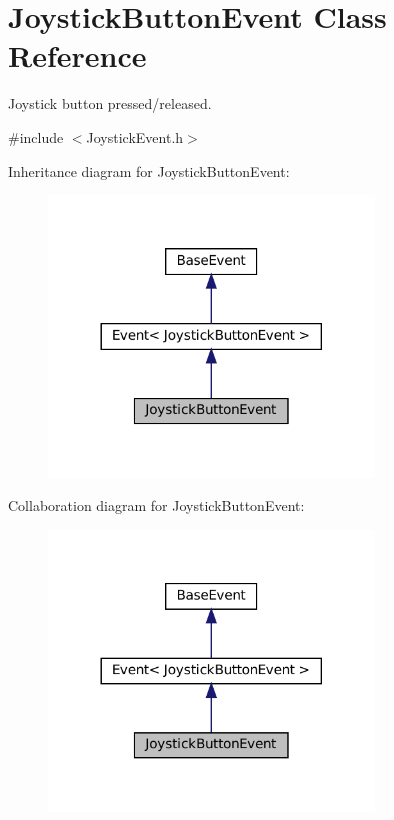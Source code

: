 \hypertarget{classJoystickButtonEvent}{}\section{Joystick\+Button\+Event Class Reference}
\label{classJoystickButtonEvent}


Joystick button pressed/released.  




{\ttfamily \#include $<$Joystick\+Event.\+h$>$}



Inheritance diagram for Joystick\+Button\+Event\+:\nopagebreak
\begin{figure}[H]
\begin{center}
\leavevmode
\includegraphics[width=245pt]{classJoystickButtonEvent__inherit__graph}
\end{center}
\end{figure}


Collaboration diagram for Joystick\+Button\+Event\+:\nopagebreak
\begin{figure}[H]
\begin{center}
\leavevmode
\includegraphics[width=245pt]{classJoystickButtonEvent__coll__graph}
\end{center}
\end{figure}
